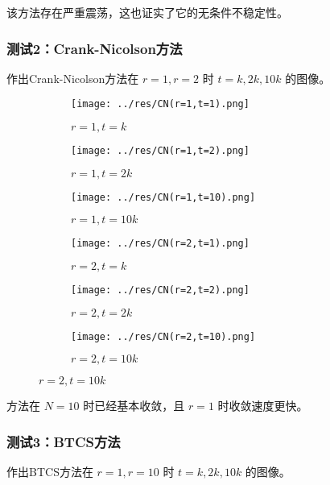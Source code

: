 \documentclass[lang=cn,a4paper,newtx,bibend=bibtex]{elegantpaper}
\begin{document}
该方法存在严重震荡，这也证实了它的无条件不稳定性。

\subsubsection{测试2：Crank-Nicolson方法}

作出Crank-Nicolson方法在 $r=1, r=2$ 时 $t=k,2k,10k$ 的图像。

\begin{figure}[H]
    \centering
    \begin{subfigure}[b]{0.30\textwidth}
        \texttt{[image: ../res/CN(r=1,t=1).png]}
        \caption{$r=1, t=k$}
    \end{subfigure}
    \hfill
    \begin{subfigure}[b]{0.30\textwidth}
        \texttt{[image: ../res/CN(r=1,t=2).png]}
        \caption{$r=1, t=2k$}
    \end{subfigure}
    \hfill
    \begin{subfigure}[b]{0.30\textwidth}
        \texttt{[image: ../res/CN(r=1,t=10).png]}
        \caption{$r=1, t=10k$}
    \end{subfigure}
    \begin{subfigure}[b]{0.30\textwidth}
        \texttt{[image: ../res/CN(r=2,t=1).png]}
        \caption{$r=2, t=k$}
    \end{subfigure}
    \hfill
    \begin{subfigure}[b]{0.30\textwidth}
        \texttt{[image: ../res/CN(r=2,t=2).png]}
        \caption{$r=2, t=2k$}
    \end{subfigure}
    \hfill
    \begin{subfigure}[b]{0.30\textwidth}
        \texttt{[image: ../res/CN(r=2,t=10).png]}
        \caption{$r=2, t=10k$}
    \end{subfigure}
  \end{figure}

方法在 $N=10$ 时已经基本收敛，且 $r=1$ 时收敛速度更快。

\subsubsection{测试3：BTCS方法}

作出BTCS方法在 $r=1, r=10$ 时 $t=k,2k,10k$ 的图像。
\end{document}
